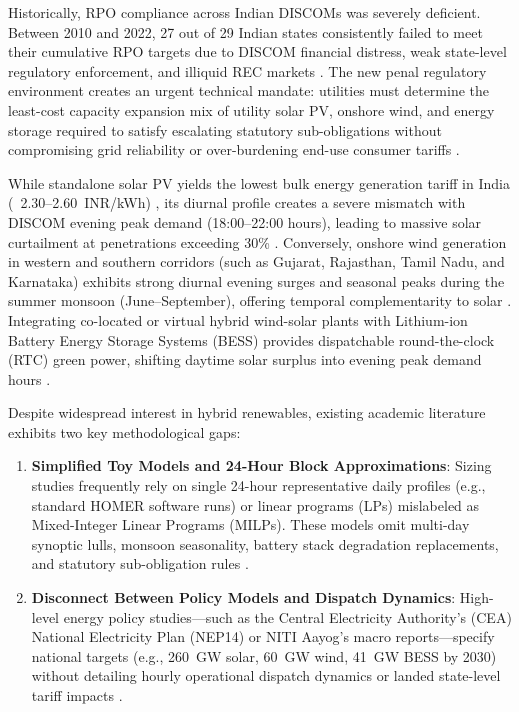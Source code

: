 \documentclass[11pt,a4paper]{article}
\begin{document}
Historically, RPO compliance across Indian DISCOMs was severely deficient. Between 2010 and 2022, 27 out of 29 Indian states consistently failed to meet their cumulative RPO targets due to DISCOM financial distress, weak state-level regulatory enforcement, and illiquid REC markets \cite{Prateek2019, Takyar2024}. The new penal regulatory environment creates an urgent technical mandate: utilities must determine the least-cost capacity expansion mix of utility solar PV, onshore wind, and energy storage required to satisfy escalating statutory sub-obligations without compromising grid reliability or over-burdening end-use consumer tariffs \cite{Gulia2021, Mothkoor2024}.

While standalone solar PV yields the lowest bulk energy generation tariff in India (~2.30--2.60~INR/kWh) \cite{IRENA2021, Gupta2024}, its diurnal profile creates a severe mismatch with DISCOM evening peak demand (18:00--22:00 hours), leading to massive solar curtailment at penetrations exceeding 30\% \cite{TERI2020}. Conversely, onshore wind generation in western and southern corridors (such as Gujarat, Rajasthan, Tamil Nadu, and Karnataka) exhibits strong diurnal evening surges and seasonal peaks during the summer monsoon (June--September), offering temporal complementarity to solar \cite{Singh2024}. Integrating co-located or virtual hybrid wind-solar plants with Lithium-ion Battery Energy Storage Systems (BESS) provides dispatchable round-the-clock (RTC) green power, shifting daytime solar surplus into evening peak demand hours \cite{Gulia2021, IEEFA2021}.

Despite widespread interest in hybrid renewables, existing academic literature exhibits two key methodological gaps:
\begin{enumerate}
    \item \textbf{Simplified Toy Models and 24-Hour Block Approximations}: Sizing studies frequently rely on single 24-hour representative daily profiles (e.g., standard HOMER software runs) or linear programs (LPs) mislabeled as Mixed-Integer Linear Programs (MILPs). These models omit multi-day synoptic lulls, monsoon seasonality, battery stack degradation replacements, and statutory sub-obligation rules \cite{Rezzouk2015}.
    \item \textbf{Disconnect Between Policy Models and Dispatch Dynamics}: High-level energy policy studies—such as the Central Electricity Authority's (CEA) National Electricity Plan (NEP14) or NITI Aayog's macro reports—specify national targets (e.g., 260~GW solar, 60~GW wind, 41~GW BESS by 2030) without detailing hourly operational dispatch dynamics or landed state-level tariff impacts \cite{Mothkoor2024, Bhadoriya2021}.
\end{enumerate}
\end{document}
